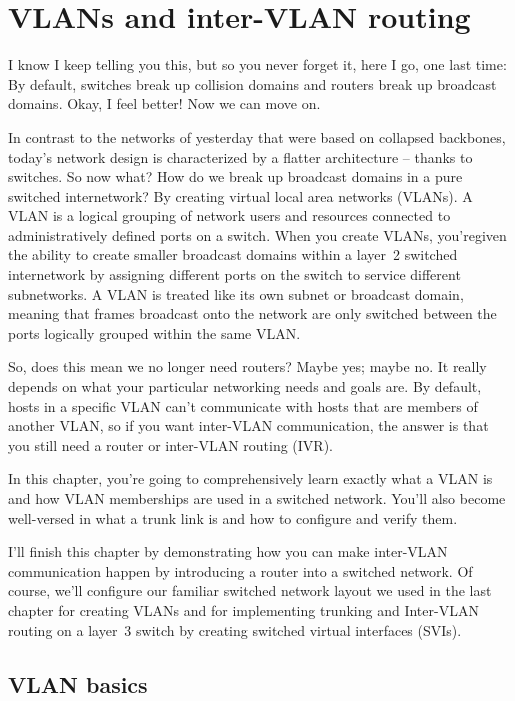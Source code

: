 \documentclass[b5paper,11pt]{memoir}
\begin{document}
\chapter{VLANs and inter-VLAN routing}
\label{chap:lammle-ch11}

I know I keep telling you this, but so you never forget it, here I go, one last time: By default, switches break up collision domains and routers break up broadcast domains.
Okay, I feel better! Now we can move on.

In contrast to the networks of yesterday that were based on collapsed
backbones, today's network design is characterized by a flatter
architecture -- thanks to switches. So now what? How do we break up
broadcast domains in a pure switched internetwork? By creating virtual
local area networks (VLANs). A VLAN is a logical grouping of network
users and resources connected to administratively defined ports on a
switch. When you create VLANs, you'regiven the ability to create smaller
broadcast domains within a layer~2 switched internetwork by assigning
different ports on the switch to service different subnetworks. A VLAN
is treated like its own subnet or broadcast domain, meaning that frames
broadcast onto the network are only switched between the ports logically
grouped within the same VLAN.

So, does this mean we no longer need routers? Maybe yes; maybe no. It
really depends on what your particular networking needs and goals are.
By default, hosts in a specific VLAN can't communicate with hosts that
are members of another VLAN, so if you want inter-VLAN communication,
the answer is that you still need a router or inter-VLAN routing (IVR).

In this chapter, you're going to comprehensively learn exactly what a VLAN is and how VLAN memberships are used in a switched network.
You'll also become well-versed in what a trunk link is and how to configure and verify them.

I'll finish this chapter by demonstrating how you can make inter-VLAN communication happen by introducing a router into a switched network.
Of course, we'll configure our familiar switched network layout we used in the last chapter for creating VLANs and for implementing trunking and Inter-VLAN routing on a layer~3 switch by creating switched virtual interfaces (SVIs).


\section{VLAN basics}
\end{document}
